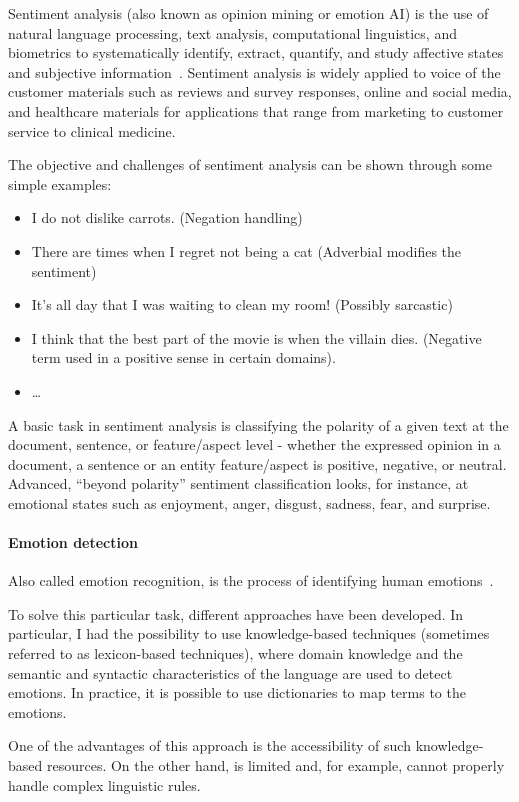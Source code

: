 Sentiment analysis (also known as opinion mining or emotion AI) is the use of natural language processing, text analysis, computational linguistics, and biometrics to systematically identify, extract, quantify, and study affective states and subjective information~\cite{enwiki:1024880646}. Sentiment analysis is widely applied to voice of the customer materials such as reviews and survey responses, online and social media, and healthcare materials for applications that range from marketing to customer service to clinical medicine.

The objective and challenges of sentiment analysis can be shown through some simple examples:
\begin{itemize}
	\item I do not dislike carrots. (Negation handling)
	\item There are times when I regret not being a cat (Adverbial modifies the sentiment)
	\item It's all day that I was waiting to clean my room! (Possibly sarcastic)
	\item I think that the best part of the movie is when the villain dies. (Negative term used in a positive sense in certain domains).
	\item \ldots
\end{itemize}

A basic task in sentiment analysis is classifying the polarity of a given text at the document, sentence, or feature/aspect level - whether the expressed opinion in a document, a sentence or an entity feature/aspect is positive, negative, or neutral. Advanced, “beyond polarity” sentiment classification looks, for instance, at emotional states such as enjoyment, anger, disgust, sadness, fear, and surprise.

\paragraph{Emotion detection}

Also called emotion recognition, is the process of identifying human emotions~\cite{enwiki:1023798177}. 

To solve this particular task, different approaches have been developed. In particular, I had the possibility to use knowledge-based techniques (sometimes referred to as lexicon-based techniques), where domain knowledge and the semantic and syntactic characteristics of the language are used to detect emotions. In practice, it is possible to use dictionaries to map  terms to the emotions. 

One of the advantages of this approach is the accessibility of such knowledge-based resources. On the other hand, is limited and, for example, cannot properly handle complex linguistic rules.

